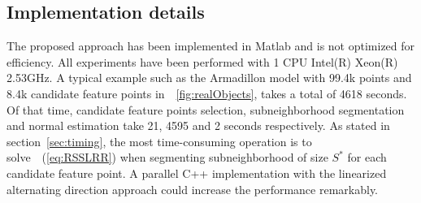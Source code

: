 \subsection{Implementation details}
\label{sec:implement}
The proposed approach has been implemented in Matlab and is not optimized for efficiency. All experiments have been performed with 1 CPU Intel(R) Xeon(R) 2.53GHz.
%
A typical example such as the Armadillon model with 99.4k points and 8.4k candidate feature points in~\fig~\ref{fig:realObjects}, takes a total of 4618 seconds. Of that time, candidate feature points selection, subneighborhood segmentation and normal estimation take 21, 4595 and 2 seconds respectively.
As stated in section~\ref{sec:timing}, the most time-consuming operation is to solve~\eq~(\ref{eq:RSSLRR}) when segmenting subneighborhood of size $S^{*}$ for each candidate feature point.
A parallel C++ implementation with the linearized alternating direction approach \cite{LinLS11} could increase the performance remarkably.
